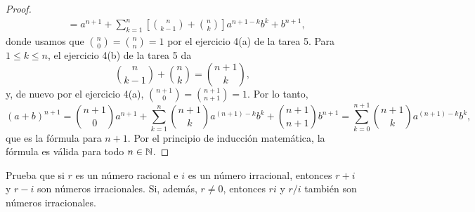 \documentclass[12pt,a4paper]{article}
\begin{document}
\begin{proof}
\begin{align*}
            &=a^{n+1}+\sum_{k=1}^{n}\left[\binom{n}{k-1}+\binom{n}{k}\right]a^{n+1-k}b^{k}+b^{n+1},
        \end{align*}
        donde usamos que $\binom{n}{0}=\binom{n}{n}=1$ por el ejercicio 4(a) de la tarea 5. Para $1\leq k\leq n$, el ejercicio 4(b) de la tarea 5 da
        \begin{equation*}
            \binom{n}{k-1}+\binom{n}{k}=\binom{n+1}{k},
        \end{equation*}
        y, de nuevo por el ejercicio 4(a), $\binom{n+1}{0}=\binom{n+1}{n+1}=1$. Por lo tanto,
        \begin{equation*}
            (a+b)^{n+1}=\binom{n+1}{0}a^{n+1}+\sum_{k=1}^{n}\binom{n+1}{k}a^{(n+1)-k}b^{k}+\binom{n+1}{n+1}b^{n+1}=\sum_{k=0}^{n+1}\binom{n+1}{k}a^{(n+1)-k}b^{k},
        \end{equation*}
        que es la fórmula para $n+1$. Por el principio de inducción matemática, la fórmula es válida para todo $n\in\mathbb{N}$.
    \end{proof}

    \begin{problema}
        Prueba que si $r$ es un número racional e $i$ es un número irracional, entonces $r+i$ y $r-i$ son números irracionales. Si, además, $r\neq0$, entonces $ri$ y $r/i$ también son números irracionales.
    \end{problema}
\end{document}
